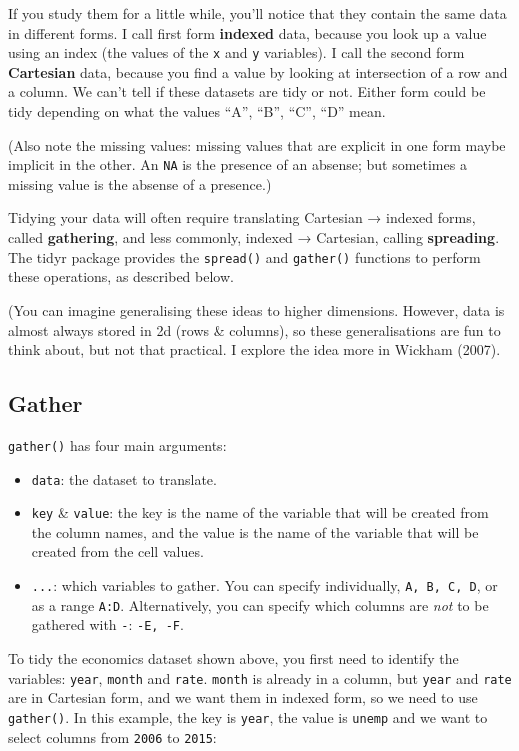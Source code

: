 If you study them for a little while, you'll notice that they contain
the same data in different forms. I call first form \textbf{indexed}
data, because you look up a value using an index (the values of the
\texttt{x} and \texttt{y} variables). I call the second form
\textbf{Cartesian} data, because you find a value by looking at
intersection of a row and a column. We can't tell if these datasets are
tidy or not. Either form could be tidy depending on what the values
``A'', ``B'', ``C'', ``D'' mean.

(Also note the missing values: missing values that are explicit in one
form maybe implicit in the other. An \texttt{NA} is the presence of an
absense; but sometimes a missing value is the absense of a presence.)

Tidying your data will often require translating Cartesian → indexed
forms, called \textbf{gathering}, and less commonly, indexed →
Cartesian, calling \textbf{spreading}. The tidyr package provides the
\texttt{spread()} and \texttt{gather()} functions to perform these
operations, as described below.

(You can imagine generalising these ideas to higher dimensions. However,
data is almost always stored in 2d (rows \& columns), so these
generalisations are fun to think about, but not that practical. I
explore the idea more in Wickham (2007).

\subsection{Gather}

\texttt{gather()} has four main arguments: 

\begin{itemize}
\item
  \texttt{data}: the dataset to translate.
\item
  \texttt{key} \& \texttt{value}: the key is the name of the variable
  that will be created from the column names, and the value is the name
  of the variable that will be created from the cell values.
\item
  \texttt{...}: which variables to gather. You can specify individually,
  \texttt{A,\ B,\ C,\ D}, or as a range \texttt{A:D}. Alternatively, you
  can specify which columns are \emph{not} to be gathered with
  \texttt{-}: \texttt{-E,\ -F}.
\end{itemize}

To tidy the economics dataset shown above, you first need to identify
the variables: \texttt{year}, \texttt{month} and \texttt{rate}.
\texttt{month} is already in a column, but \texttt{year} and
\texttt{rate} are in Cartesian form, and we want them in indexed form,
so we need to use \texttt{gather()}. In this example, the key is
\texttt{year}, the value is \texttt{unemp} and we want to select columns
from \texttt{2006} to \texttt{2015}:

